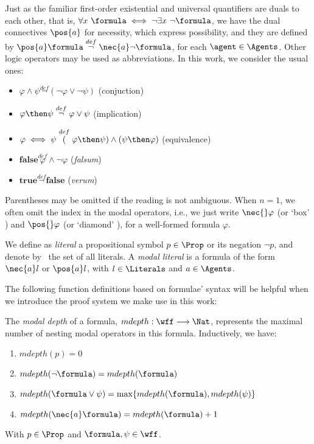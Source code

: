 Just as the familiar first-order existential and universal quantifiers are duals
to each other, that is, $\forall x\ \formula \iff \neg \exists x\ \neg \formula$, we have
the dual connectives $\pos{a}$ for necessity, which express possibility, and
they are defined by $\pos{a} \formula \stackrel{def} \neg \nec{a} \neg \formula$, for each
$\agent \in \Agents$. Other logic operators may be used as abbreviations.
In this work, we consider the usual ones:
\begin{itemize}
    \item $\varphi \wedge \psi \stackrel{def} \neg(\neg \varphi \lor \neg \psi)$ (conjuction)
    \item $\varphi \then \psi \stackrel{def} \neg \varphi \lor \psi$ (implication)
    \item $\varphi \iff \psi \stackrel{def} (\varphi \then \psi) \land (\psi \then \varphi)$ (equivalence)
    \item $\textbf{false} \stackrel{def} \varphi \wedge \neg \varphi$ (\emph{falsum})
    \item $ \textbf{true} \stackrel{def} \neg \textbf{false}$ (\emph{verum}) 
\end{itemize}

Parentheses may be omitted if the reading is not ambiguous.  When $n = 1$, we
often omit the index in the modal operators, i.e., we just write $\nec{}
\varphi$ (or `box' \formula) and $\pos{}\varphi$ (or `diamond' \formula), for a
well-formed formula $\varphi$. 

We define as \emph{literal} a propositional symbol $p \in \Prop$ or its negation $\neg
p$, and denote by \Literals~the set of all literals. A \emph{modal literal} is a
formula of the form $\nec{a} l$ or $\pos{a} l$, with $l \in \Literals$ and $a
\in \Agents$.

The following function definitions based on formulae' syntax will be helpful
when we introduce the proof system we make use in this work:

\begin{definition}
    The \emph{modal depth} of a formula, $mdepth : \wff \longrightarrow \Nat$,
    represents the maximal number of nesting modal operators in this formula.
    Inductively, we have:
    \begin{enumerate}
        \item $mdepth(p) = 0$ 
        \item $mdepth(\neg \formula) = mdepth(\formula)$
        \item $mdepth(\formula \lor \psi) = \max\{mdepth(\formula), mdepth(\psi)\}$
        \item $mdepth(\nec{a} \formula) = mdepth(\formula) + 1$
    \end{enumerate}
    With $p \in \Prop$ and $\formula, \psi \in \wff$.
\end{definition}

